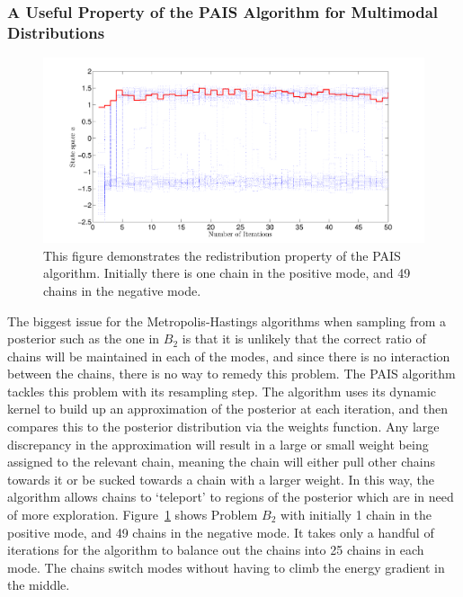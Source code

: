 \documentclass[final]{siamltex}
\begin{document}
\subsubsection{A Useful Property of the PAIS Algorithm for Multimodal Distributions}

\begin{figure}[!h]
\begin{center}
\includegraphics[width=\textwidth]{"figures/BM2_suction"}
\caption{This figure demonstrates the redistribution property of the PAIS algorithm. Initially there is one chain in the positive mode, and 49 chains in the negative mode.}
\label{fig:BM2_suction}
\end{center}
\end{figure}

The biggest issue for the Metropolis-Hastings algorithms when sampling
from a posterior such as the one in $B_2$ is that it is unlikely that
the correct ratio of chains will be maintained in each of the modes, and since there is no interaction between the chains, there is no way to remedy this problem. The PAIS algorithm tackles this problem with its resampling step. The algorithm uses its dynamic kernel to build up an approximation of the posterior at each iteration, and then compares this to the posterior distribution via the weights function. Any large discrepancy in the approximation will result in a large or small weight being assigned to the relevant chain, meaning the chain will either pull other chains towards it or be sucked towards a chain with a larger weight. In this way, the algorithm allows chains to `teleport' to regions of the posterior which are in need of more exploration. Figure~\ref{fig:BM2_suction} shows Problem $B_2$ with initially 1 chain in the positive mode, and 49 chains in the negative mode. It takes only a handful of iterations for the algorithm to balance out the chains into 25 chains in each mode. The chains switch modes without having to climb the energy gradient in the middle.
\end{document}
